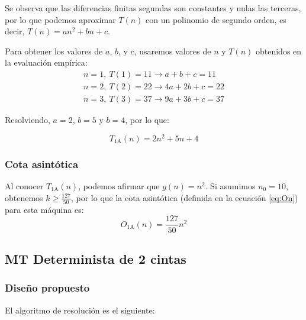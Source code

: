 Se observa que las diferencias finitas segundas son constantes y nulas las terceras, por lo que podemos aproximar $T(n)$ con un polinomio de segundo orden, es decir, $T(n) = an^2 + bn + c$.\medskip

Para obtener los valores de $a$, $b$, y $c$, usaremos valores de $n$ y $T(n)$ obtenidos en la evaluación empírica:
\begin{subequations}
    \begin{gather*}
        n = 1,\ T(1) = 11 \rightarrow a + b + c = 11 \\
        n = 2,\ T(2) = 22 \rightarrow 4a + 2b + c = 22 \\
        n = 3,\ T(3) = 37 \rightarrow 9a + 3b + c = 37
    \end{gather*}
\end{subequations}

Resolviendo, $a=2$, $b=5$ y $b=4$, por lo que:

\begin{equation}
    T_{\mathrm{1A}}(n) = 2n^2 + 5n + 4
\end{equation}

\subsubsection*{Cota asintótica}
Al conocer $T_{\mathrm{1A}}(n)$, podemos afirmar que $g(n) = n^2$. Si asumimos $n_0 = 10$, obtenemos $k \geq \frac{127}{50}$, por lo que la cota asintótica (definida en la ecuación \ref{eq:On}) para esta máquina es:
\begin{equation}
    O_{\mathrm{1A}}(n) = \frac{127}{50} n^2
\end{equation}






\subsection{MT Determinista de 2 cintas}

\subsubsection*{Diseño propuesto}
El algoritmo de resolución es el siguiente:

